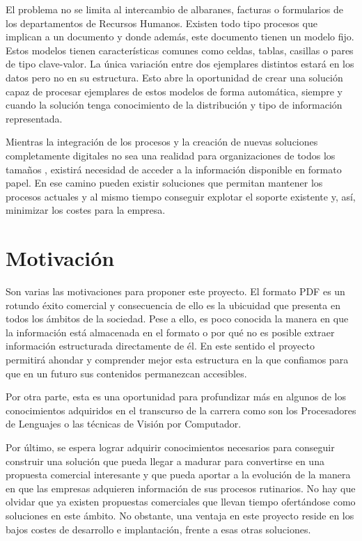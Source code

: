 El problema no se limita al intercambio de albaranes, facturas o formularios de los departamentos de Recursos Humanos. Existen todo tipo procesos que implican a un documento y donde además, este documento tienen un modelo fijo. Estos modelos tienen características comunes como celdas, tablas, casillas o pares de tipo clave-valor. La única variación entre dos ejemplares distintos estará en los datos pero no en su estructura. Esto abre la oportunidad de crear una solución capaz de procesar ejemplares de estos modelos de forma automática, siempre y cuando la solución tenga conocimiento de la distribución y tipo de información representada. 

Mientras la integración de los procesos y la creación de nuevas soluciones completamente digitales \cite{elpais_news_utopiaOficinaSinPapel} no sea una realidad para organizaciones de todos los tamaños \cite{confidencial_news_transformacionOnline}, existirá necesidad de acceder a la información disponible en formato papel. En ese camino pueden existir soluciones que permitan mantener los procesos actuales y al mismo tiempo conseguir explotar el soporte existente y, así, minimizar los costes para la empresa. 

\section{Motivación}

Son varias las motivaciones para proponer este proyecto. El formato PDF es un rotundo éxito comercial y consecuencia de ello es la ubicuidad que presenta en todos los ámbitos de la sociedad. Pese a ello, es poco conocida la manera en que la información está almacenada en el formato o por qué no es posible extraer información estructurada directamente de él. En este sentido el proyecto permitirá ahondar y comprender mejor esta estructura en la que confiamos para que en un futuro sus contenidos permanezcan accesibles.

Por otra parte, esta es una oportunidad para profundizar más en algunos de los conocimientos adquiridos en el transcurso de la carrera como son los Procesadores de Lenguajes o las técnicas de Visión por Computador.

Por último, se espera lograr adquirir conocimientos necesarios para conseguir construir una solución que pueda llegar a madurar para convertirse en una propuesta comercial interesante y que pueda aportar a la evolución de la manera en que las empresas adquieren información de sus procesos rutinarios. No hay que olvidar que ya existen propuestas comerciales que llevan tiempo ofertándose como soluciones en este ámbito. No obstante, una ventaja en este proyecto reside en los bajos costes de desarrollo e implantación, frente a esas otras soluciones.

